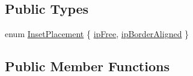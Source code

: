 \subsection*{Public Types}
\begin{DoxyCompactItemize}
\item 
enum \hyperlink{classQCPLayoutInset_a8b9e17d9a2768293d2a7d72f5e298192}{Inset\+Placement} \{ \hyperlink{classQCPLayoutInset_a8b9e17d9a2768293d2a7d72f5e298192aa4802986ea2cea457f932b115acba59e}{ip\+Free}, 
\hyperlink{classQCPLayoutInset_a8b9e17d9a2768293d2a7d72f5e298192aa81e7df4a785ddee2229a8f47c46e817}{ip\+Border\+Aligned}
 \}
\end{DoxyCompactItemize}
\subsection*{Public Member Functions}
